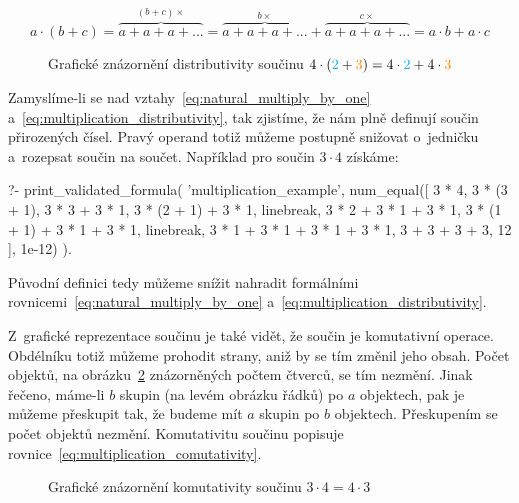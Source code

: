 \begin{equation}
\label{eq:multiplication_distributivity_proof}
a \cdot (b + c) = \overbrace{a + a + a + ...}^{(b + c) \times} = \overbrace{a + a + a + ...}^{b \times} + \overbrace{a + a + a + ...}^{c \times} = a \cdot b + a \cdot c
\end{equation}

\begin{figure}[!h]
\centering
{}
\caption{Grafické znázornění distributivity součinu \(4 \cdot (\textcolor{cyan}{2} + \textcolor{orange}{3}) = 4 \cdot \textcolor{cyan}{2} + 4 \cdot \textcolor{orange}{3}\)}
\label{img:multiplication_distributivity}
\end{figure}

Zamyslíme-li se nad vztahy~\ref{eq:natural_multiply_by_one} a~\ref{eq:multiplication_distributivity}, tak zjistíme, že nám plně definují součin přirozených čísel. Pravý operand totiž můžeme postupně snižovat o~jedničku a~rozepsat součin na součet. Například pro součin \(3 \cdot 4\) získáme:

\begin{prolog}
?-	print_validated_formula(
		'multiplication_example',
		num_equal([
			3 * 4,
			3 * (3 + 1),
			3 * 3 + 3 * 1,
			3 * (2 + 1) + 3 * 1,
			linebreak,
			3 * 2 + 3 * 1 + 3 * 1,
			3 * (1 + 1) + 3 * 1 + 3 * 1,
			linebreak,
			3 * 1 + 3 * 1 + 3 * 1 + 3 * 1,
			3 + 3 + 3 + 3,
			12
		], 1e-12)
	).				
\end{prolog}

Původní definici tedy můžeme snížit nahradit formálními rovnicemi~\ref{eq:natural_multiply_by_one} a~\ref{eq:multiplication_distributivity}.

Z~grafické reprezentace součinu je také vidět, že součin je komutativní operace. Obdélníku totiž můžeme prohodit strany, aniž by se tím změnil jeho obsah. Počet objektů, na obrázku~\ref{img:multiplication_comutativity} znázorněných počtem čtverců, se tím nezmění. Jinak řečeno, máme-li \(b\) skupin (na levém obrázku řádků) po \(a\) objektech, pak je můžeme přeskupit tak, že budeme mít \(a\) skupin po \(b\) objektech. Přeskupením se počet objektů nezmění. Komutativitu součinu popisuje rovnice~\eqref{eq:multiplication_comutativity}.

\begin{figure}[!h]
\centering
{}
\caption{Grafické znázornění komutativity součinu \(3 \cdot 4 = 4 \cdot 3\)}
\label{img:multiplication_comutativity}
\end{figure}

